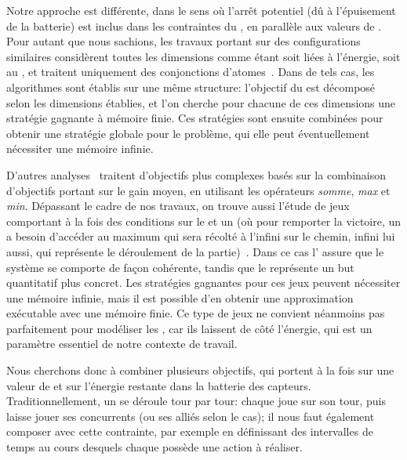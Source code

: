Notre approche est différente, dans le sens où l'arrêt potentiel (dû à l'épuisement de la batterie) est inclus dans les contraintes du , en parallèle aux valeurs de .
Pour autant que nous sachions, les travaux portant sur des configurations similaires considèrent toutes les dimensions comme étant soit liées à l'énergie, soit au , et traitent uniquement des conjonctions d'atomes~\cite{chatterjee12,velner12a}.
Dans de tels cas, les algorithmes sont établis sur une même structure: l'objectif du  est décomposé selon les dimensions établies, et l'on cherche pour chacune de ces dimensions une stratégie gagnante à mémoire finie.
Ces stratégies sont ensuite combinées pour obtenir une stratégie globale pour le problème, qui elle peut éventuellement nécessiter une mémoire infinie.

D'autres analyses~\cite{velner12b} traitent d'objectifs plus complexes basés sur la combinaison d'objectifs portant sur le gain moyen, en utilisant les opérateurs \textit{somme}, \textit{max} et \textit{min}.
Dépassant le cadre de nos travaux, on trouve aussi l'étude de jeux comportant à la fois des conditions sur le  et un  (où pour remporter la victoire, un  a besoin d'accéder au  maximum qui sera récolté à l'infini sur le chemin, infini lui aussi, qui représente le déroulement de la partie)~\cite{chatterjee05}.
Dans ce cas l' assure que le système se comporte de façon cohérente, tandis que le  représente un but quantitatif plus concret.
Les stratégies gagnantes pour ces jeux peuvent nécessiter une mémoire infinie, mais il est possible d'en obtenir une approximation exécutable avec une mémoire finie.
Ce type de jeux ne convient néanmoins pas parfaitement pour modéliser les \rcs, car ils laissent de côté l'énergie, qui est un paramètre essentiel de notre contexte de travail.

Nous cherchons donc à combiner plusieurs objectifs, qui portent à la fois sur une valeur de  et sur l'énergie restante dans la batterie des capteurs.
Traditionnellement, un  se déroule tour par tour: chaque  joue sur son tour, puis laisse jouer ses concurrents (ou ses alliés selon le cas); il nous faut également composer avec cette contrainte, par exemple en définissant des intervalles de temps au cours desquels chaque  possède une action à réaliser.
